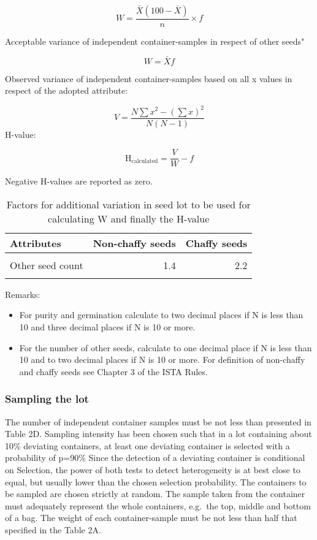 \documentclass[
]{book}
\providecommand{\tightlist}{%
  \setlength{\itemsep}{0pt}\setlength{\parskip}{0pt}}
\begin{document}
\[
W = \frac{\bar{X}(100-\bar{X})}{n}\times f
\]

Acceptable variance of independent container-samples in respect of other seeds"

\[
W = \bar{X} f
\]

Observed variance of independent container-samples based on all x values in respect of the adopted attribute:

\[
V = \frac{N\sum{x}^2 - (\sum{x})^2}{N(N-1)}
\]
H-value:

\[
\mathrm{H_{calculated}} = \frac{V}{W} - f
\]

Negative H-values are reported as zero.

\begin{table}

\caption{\label{tab:unnamed-chunk-2}Factors for additional variation in seed lot to be used for calculating W and finally the H-value}
\centering
\fontsize{10}{12}\selectfont
\begin{tabular}[t]{lrr}
\toprule
Attributes & Non-chaffy seeds & Chaffy seeds\\
\midrule
\cellcolor{gray!6}{Purity} & \cellcolor{gray!6}{1.1} & \cellcolor{gray!6}{1.2}\\
Other seed count & 1.4 & 2.2\\
\cellcolor{gray!6}{Germination} & \cellcolor{gray!6}{1.1} & \cellcolor{gray!6}{1.2}\\
\bottomrule
\end{tabular}
\end{table}

Remarks:

\begin{itemize}
\tightlist
\item
  For purity and germination calculate to two decimal places if N is less than 10 and three decimal places if N is 10 or more.
\item
  For the number of other seeds, calculate to one decimal place if N is less than 10 and to two decimal places if N is 10 or more. For definition of non-chaffy and chaffy seeds see Chapter 3 of the ISTA Rules.
\end{itemize}

\hypertarget{sampling-the-lot}{%
\subsubsection{Sampling the lot}\label{sampling-the-lot}}

The number of independent container samples must be not less than presented in Table 2D. Sampling intensity has been chosen such that in a lot containing about 10\% deviating containers, at least one deviating container is selected with a probability of p=90\% Since the detection of a deviating container is conditional on Selection, the power of both tests to detect heterogeneity is at best close to equal, but usually lower than the chosen selection probability. The containers to be sampled are chosen strictly at random. The sample taken from the container must adequately represent the whole containers, e.g.~the top, middle and bottom of a bag. The weight of each container-sample must be not less than half that specified in the Table 2A.
\end{document}
